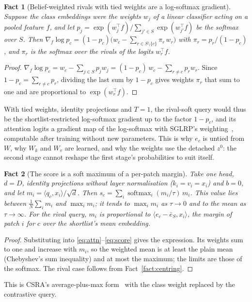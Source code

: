 \documentclass[11pt,a4paper]{article}
\theoremstyle{plain}
\newtheorem{fact}{Fact}
\newcommand{\eS}{\bar e_S}
\begin{document}
\begin{fact}[Belief-weighted rivals with tied weights are a log-softmax gradient]\label{fact:grad}
Suppose the class embeddings were the weights $w_j$ of a linear classifier acting on a pooled feature $f$, and let
$p_j=\exp(w_j^{\top}f)/\sum_{j'\in S}\exp(w_{j'}^{\top}f)$ be the softmax over $S$. Then
$\nabla_f\log p_c=(1-p_c)\bigl(w_c-\sum_{r\in S\setminus\{c\}}\pi_r\,w_r\bigr)$ with $\pi_r=p_r/(1-p_c)$, and
$\pi_r$ is the softmax over the rivals of the logits $w_r^{\top}f$.
\end{fact}
\begin{proof}
$\nabla_f\log p_c=w_c-\sum_{j\in S}p_jw_j=(1-p_c)\,w_c-\sum_{r\neq c}p_rw_r$. Since $1-p_c=\sum_{r\neq c}p_r$,
dividing the last sum by $1-p_c$ gives weights $\pi_r$ that sum to one and are proportional to $\exp(w_r^{\top}f)$.
\end{proof}
With tied weights, identity projections and $T=1$, the rival-soft query would thus be the shortlist-restricted
log-softmax gradient up to the factor $1-p_c$, and its attention logits a gradient map of the log-softmax with
SGLRP's weighting~\citep{iwana2019sglrp}, computable after training without new parameters. This is why $e_c$ is
untied from $W$, why $W_k$ and $W_v$ are learned, and why the weights use the detached $z^0$: the second stage cannot
reshape the first stage's probabilities to suit itself.

\begin{fact}[The score is a soft maximum of a per-patch margin]\label{fact:score}
Take one head, $d=D$, identity projections without layer normalisation ($k_i=v_i=x_i$) and $b=0$, and let
$m_i=\langle q_c,x_i\rangle/\sqrt d$. Then $s_c=\sum_i\operatorname{softmax}_i(m_i/\tau)\,m_i$. This value lies between
$\frac1N\sum_im_i$ and $\max_im_i$; it tends to $\max_im_i$ as $\tau\to0$ and to the mean as $\tau\to\infty$. For the
rival query, $m_i$ is proportional to $\langle e_c-\eS,x_i\rangle$, the margin of patch $i$ for $c$ over the
shortlist's mean embedding.
\end{fact}
\begin{proof}
Substituting into \eqref{eq:attn}--\eqref{eq:score} gives the expression. Its weights sum to one and increase with
$m_i$, so the weighted mean is at least the plain mean (Chebyshev's sum inequality) and at most the maximum; the
limits are those of the softmax. The rival case follows from Fact~\ref{fact:centring}.
\end{proof}
This is CSRA's average-plus-max form~\citep{zhu2021csra} with the class weight replaced by the contrastive query.
\end{document}

